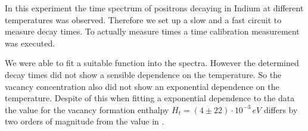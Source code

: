 In this experiment the time spectrum of positrons decaying in Indium at different temperatures was observed. Therefore we set up a slow and a fast circuit to measure decay times. To actually measure times a time calibration measurement was executed.

We were able to fit a suitable function into the spectra. However the determined decay times did not show a sensible dependence on the temperature. So the vacancy concentration also did not show an exponential dependence on the temperature. Despite of this when fitting a exponential dependence to the data the value for the vacancy formation enthalpy $H_t = (4 \pm 22) \cdot 10^{-3}\,\si{eV}$ differs by two orders of magnitude from the value in \cite{enthalpy}. 